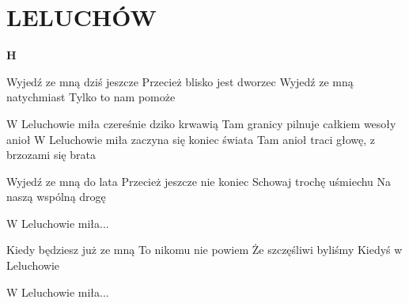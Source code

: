 \documentclass[../../../songbook.tex]{subfiles}
\begin{document}
\TabPositions{8cm} %
\section*{LELUCHÓW}
\vspace{0.5cm}
{\color{red}\textbf{H} } \newline

Wyjedź ze mną dziś jeszcze 		 \newline
Przecież blisko jest dworzec 	 \newline
Wyjedź ze mną natychmiast 		 \newline
Tylko to nam pomoże 			 \newline

\-\hspace{0.8cm} W Leluchowie miła czereśnie dziko krwawią 	 \newline
\-\hspace{0.8cm} Tam granicy pilnuje całkiem wesoły anioł 	 \newline
\-\hspace{0.8cm} W Leluchowie miła zaczyna się koniec świata 	 \newline
\-\hspace{0.8cm} Tam anioł traci głowę, z brzozami się brata 	 \newline

Wyjedź ze mną do lata 		\newline
Przecież jeszcze nie koniec \newline
Schowaj trochę uśmiechu 	\newline
Na naszą wspólną drogę 		\newline

\-\hspace{0.8cm} W Leluchowie miła... \newline

Kiedy będziesz już ze mną	\newline
To nikomu nie powiem		\newline
Że szczęśliwi byliśmy		\newline
Kiedyś w Leluchowie			\newline

\-\hspace{0.8cm} W Leluchowie miła...
\end{document}
